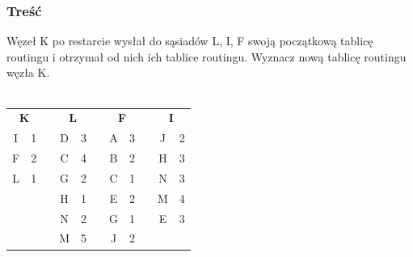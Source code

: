 		\subsubsection{Treść}
			Węzeł K po restarcie wysłał do sąsiadów L, I, F swoją początkową tablicę routingu i otrzymał od nich ich tablice routingu. Wyznacz nową tablicę routingu węzła K.\\\\
			\begin{tabular}{cc m{1cm}|c|c|c|c|c|ccc}
				\cline{1-2} \cline{4-5} \cline{7-8} \cline{10-11}
				\multicolumn{2}{|c|}{\textbf{K}}                 &  & \multicolumn{2}{c|}{\textbf{L}} &  & \multicolumn{2}{c|}{\textbf{F}} & \multicolumn{1}{c|}{} & \multicolumn{2}{c|}{\textbf{I}}                 \\ \cline{1-2} \cline{4-5} \cline{7-8} \cline{10-11} 
				\multicolumn{1}{|c|}{I} & \multicolumn{1}{c|}{1} &  & D              & 3              &  & A              & 3              & \multicolumn{1}{c|}{} & \multicolumn{1}{c|}{J} & \multicolumn{1}{c|}{2} \\ \cline{1-2} \cline{4-5} \cline{7-8} \cline{10-11} 
				\multicolumn{1}{|c|}{F} & \multicolumn{1}{c|}{2} &  & C              & 4              &  & B              & 2              & \multicolumn{1}{c|}{} & \multicolumn{1}{c|}{H} & \multicolumn{1}{c|}{3} \\ \cline{1-2} \cline{4-5} \cline{7-8} \cline{10-11} 
				\multicolumn{1}{|c|}{L} & \multicolumn{1}{c|}{1} &  & G              & 2              &  & C              & 1              & \multicolumn{1}{c|}{} & \multicolumn{1}{c|}{N} & \multicolumn{1}{c|}{3} \\ \cline{1-2} \cline{4-5} \cline{7-8} \cline{10-11} 
				&                        &  & H              & 1              &  & E              & 2              & \multicolumn{1}{c|}{} & \multicolumn{1}{c|}{M} & \multicolumn{1}{c|}{4} \\ \cline{4-5} \cline{7-8} \cline{10-11} 
				&                        &  & N              & 2              &  & G              & 1              & \multicolumn{1}{c|}{} & \multicolumn{1}{c|}{E} & \multicolumn{1}{c|}{3} \\ \cline{4-5} \cline{7-8} \cline{10-11} 
				&                        &  & M              & 5              &  & J              & 2              &                       &                        &                        \\ \cline{4-5} \cline{7-8}
			\end{tabular}
